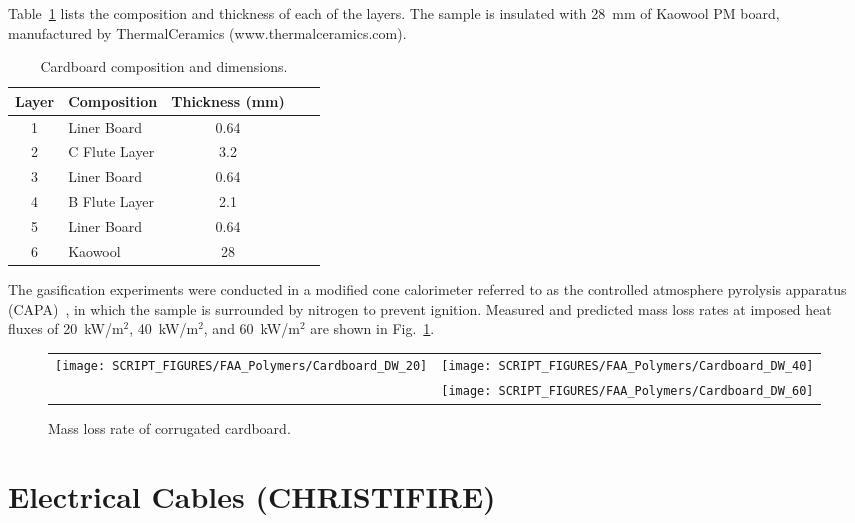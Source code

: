 \noindent Table~\ref{Dimensions_Cardboard} lists the composition and thickness of each of the layers. The sample is insulated with 28~mm of Kaowool PM board, manufactured by ThermalCeramics (www.thermalceramics.com).
\begin{table}[h!]
\caption[Cardboard composition and dimensions]{Cardboard composition and dimensions.}
\begin{center}
\begin{tabular}{|c|l|c|l|l|}
\hline
Layer	  & Composition   & Thickness (mm) \\ \hline \hline
1	      & Liner Board	  & 0.64       \\ \hline
2	      & C Flute Layer & 3.2        \\ \hline
3	      & Liner Board	  & 0.64       \\ \hline
4	      & B Flute Layer & 2.1        \\ \hline
5	      & Liner Board	  & 0.64       \\ \hline
6	      & Kaowool	      & 28         \\ \hline
\end{tabular}
\end{center}
\label{Dimensions_Cardboard}
\end{table}
The gasification experiments were conducted in a modified cone calorimeter referred to as the controlled atmosphere pyrolysis apparatus (CAPA)~\cite{Semmes:IAFSS11}, in which the sample is surrounded by nitrogen to prevent ignition. Measured and predicted mass loss rates at imposed heat fluxes of 20~kW/m$^2$, 40~kW/m$^2$, and 60~kW/m$^2$ are shown in Fig.~\ref{MLR_Cardboard}.

\begin{figure}[h!]
\begin{tabular*}{\textwidth}{l@{\extracolsep{\fill}}r}
\texttt{[image: SCRIPT\_FIGURES/FAA\_Polymers/Cardboard\_DW\_20]} &
\texttt{[image: SCRIPT\_FIGURES/FAA\_Polymers/Cardboard\_DW\_40]} \\
 & \texttt{[image: SCRIPT\_FIGURES/FAA\_Polymers/Cardboard\_DW\_60]}
\end{tabular*}
\caption[Mass loss rate of corrugated cardboard]{Mass loss rate of corrugated cardboard.}
\label{MLR_Cardboard}
\end{figure}





\clearpage


\section{Electrical Cables (CHRISTIFIRE)}

